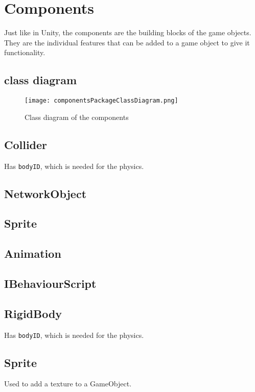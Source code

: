 \section{Components}
\label{sec:components}
Just like in Unity, the components are the building blocks of the game objects.
They are the individual features that can be added to a game object to give it functionality.

\subsection{class diagram}
\begin{figure}[H]
    \texttt{[image: componentsPackageClassDiagram.png]}
    \caption{Class diagram of the components}
    \label{fig:components}
\end{figure}

\subsection{Collider}
Has \texttt{bodyID}, which is needed for the physics.

\subsection{NetworkObject}

\subsection{Sprite}

\subsection{Animation}

\subsection{IBehaviourScript}

\subsection{RigidBody}
Has \texttt{bodyID}, which is needed for the physics.

\subsection{Sprite}
Used to add a texture to a GameObject.

